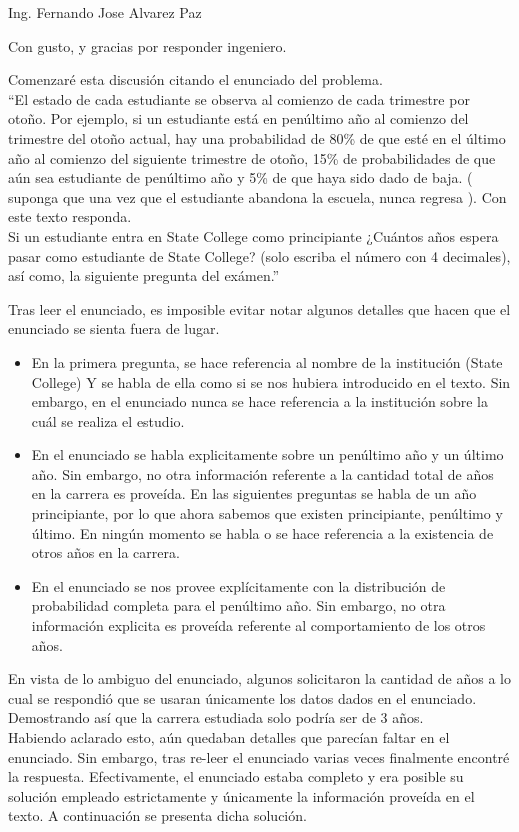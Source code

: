 \documentclass{letter}
\begin{document}
\begin{letter}{Ing. Fernando Jose Alvarez Paz}
  \opening{Con gusto, y gracias por responder ingeniero.}
Comenzaré esta discusión citando el enunciado del problema. \\
``El estado de cada estudiante se observa al comienzo de cada 
trimestre por otoño. Por ejemplo, si un estudiante está en penúltimo
año al comienzo del trimestre del otoño actual, hay una probabilidad
de 80\% 
de que esté en el último año al comienzo del siguiente trimestre de 
otoño, 15\% de probabilidades de que aún sea estudiante de penúltimo
año y 5\% de que haya sido dado de baja. ( suponga que una vez 
que el estudiante abandona la escuela, nunca regresa ). Con este texto
responda. \\
Si un estudiante entra en State College como principiante
¿Cuántos años espera pasar como estudiante de State College? 
(solo escriba el número con 4 decimales), así como, la siguiente 
pregunta del exámen.''

Tras leer el enunciado, es imposible evitar notar algunos detalles que
hacen que el enunciado se sienta fuera de lugar.
  \begin{itemize} 
    \item En la primera pregunta, se hace referencia al nombre de 
      la institución (State College) Y se habla de ella como 
      si se nos hubiera introducido en el texto. Sin embargo, 
      en el enunciado nunca se hace referencia a la institución 
      sobre la cuál se realiza el estudio.
    \item En el enunciado se habla explicitamente sobre un penúltimo año
      y un último año. Sin 
      embargo, no otra información referente a la cantidad total de 
      años en la carrera es proveída. En las siguientes preguntas 
      se habla de un año principiante, por lo que ahora sabemos que 
      existen principiante, penúltimo y último. En ningún momento
      se habla o se hace referencia a la existencia de otros años en 
      la carrera.
    \item En el enunciado se nos provee explícitamente con 
      la distribución de probabilidad completa para el penúltimo año. 
      Sin embargo, no otra información explicita es proveída referente al 
      comportamiento de los otros años.
  \end{itemize}
  En vista de lo ambiguo del enunciado, 
  algunos solicitaron la cantidad de años a lo cual se respondió 
  que se usaran únicamente los datos dados en el enunciado. Demostrando 
  así que la carrera estudiada solo podría ser de 3 años. \\
  Habiendo aclarado esto, aún quedaban detalles que parecían faltar en el
  enunciado. Sin embargo, tras re-leer el enunciado varias veces
  finalmente encontré 
  la respuesta. Efectivamente, el enunciado estaba completo y era
  posible su solución empleado estrictamente y únicamente la información
  proveída en el texto. A continuación se presenta dicha solución.


\end{letter}
\end{document}
